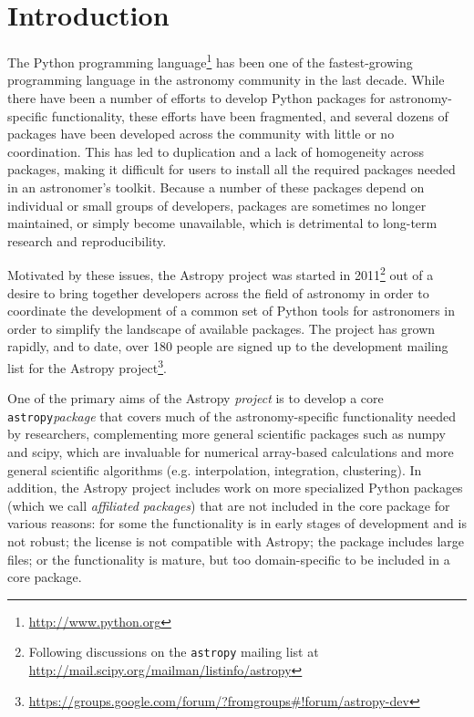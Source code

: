 \documentclass[traditabstract]{aa}
\newcommand{\astropy}{\texttt{astropy}\xspace}
\begin{document}
\section{Introduction}


The Python programming language\footnote{\url{http://www.python.org}} has been
one of the fastest-growing programming language in the astronomy community in
the last decade. While there have been a number of efforts to develop Python
packages for astronomy-specific functionality, these efforts have been
fragmented, and several dozens of packages have been developed across the
community with little or no coordination. This has led to duplication and a
lack of homogeneity across packages, making it difficult for users to install
all the required packages needed in an astronomer's toolkit. Because a number
of these packages depend on individual or small groups of developers, packages
are sometimes no longer maintained, or simply become unavailable, which is
detrimental to long-term research and reproducibility.

Motivated by these issues, the Astropy project was started in
2011\footnote{Following discussions on the \texttt{astropy} mailing list at
\url{http://mail.scipy.org/mailman/listinfo/astropy}} out of a desire to bring
together developers across the field of astronomy in order to coordinate the
development of a common set of Python tools for astronomers in order to
simplify the landscape of available packages. The project has grown rapidly,
and to date, over 180 people are signed up to the development mailing list for
the Astropy project\footnote{
\url{https://groups.google.com/forum/?fromgroups#!forum/astropy-dev}}.

One of the primary aims of the Astropy \textit{project} is to develop a core
\astropy \textit{package} that covers much of the astronomy-specific
functionality needed by researchers, complementing more general scientific
packages such as \gls{numpy} and \gls{scipy}, which are invaluable for
numerical array-based calculations and more general scientific algorithms (e.g.
interpolation, integration, clustering). In addition, the Astropy project
includes work on more specialized Python packages (which we call
\textit{affiliated packages}) that are not included in the core package for
various reasons: for some the functionality is in early stages of development
and is not robust; the license is not compatible with Astropy; the package
includes large files; or the functionality is mature, but too domain-specific
to be included in a core package.
\end{document}
